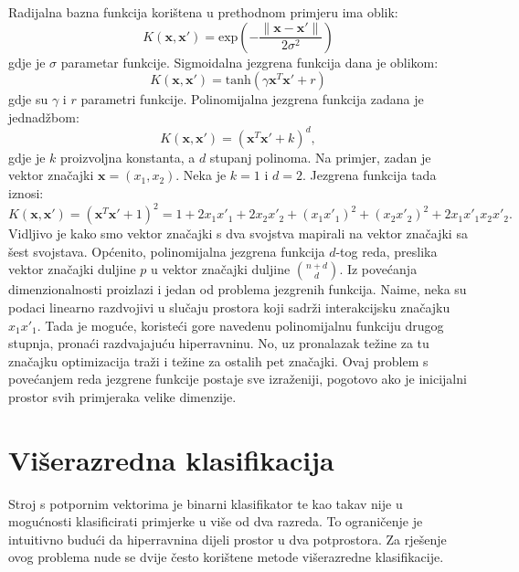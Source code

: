 \documentclass[times, utf8, zavrsni, numeric]{fer}
\begin{document}
Radijalna bazna funkcija korištena u prethodnom primjeru ima oblik:
\begin{equation*}
  K(\mathbf{x}, \mathbf{x}') = \text{exp}(- \frac{\|\mathbf{x} - \mathbf{x}'\|}{2\sigma^2})
\end{equation*}
gdje je $\sigma$ parametar funkcije. Sigmoidalna jezgrena funkcija dana je oblikom:
\begin{equation*}
  K(\mathbf{x}, \mathbf{x}') = \text{tanh}(\gamma\mathbf{x}^T\mathbf{x}' + r)
\end{equation*}
gdje su $\gamma$ i $r$ parametri funkcije.
Polinomijalna jezgrena funkcija zadana je jednadžbom:
\begin{equation*}
  K(\mathbf{x}, \mathbf{x}') = (\mathbf{x}^T\mathbf{x}' + k)^d,
\end{equation*}
gdje je $k$ proizvoljna konstanta, a $d$ stupanj polinoma.
Na primjer, zadan je vektor značajki $\mathbf{x} = (x_1, x_2)$. 
Neka je $k=1$ i $d=2$. Jezgrena funkcija tada iznosi:
\begin{equation*}
  K(\mathbf{x}, \mathbf{x}') = (\mathbf{x}^T\mathbf{x}' + 1)^2 =
  1 + 2x_1x'_1 + 2x_2x'_2 + (x_1x'_1)^2 + (x_2x'_2)^2 + 2x_1x'_1x_2x'_2.
\end{equation*}
Vidljivo je kako smo vektor značajki s dva svojstva mapirali na vektor značajki sa šest svojstava.
Općenito, polinomijalna jezgrena funkcija $d$-tog reda, preslika vektor značajki duljine $p$ u 
vektor značajki duljine $\binom{n + d}{d}$.
Iz povećanja dimenzionalnosti proizlazi i jedan od problema jezgrenih funkcija.
Naime, neka su podaci linearno razdvojivi u slučaju prostora koji sadrži interakcijsku značajku
$x_1x'_1$. Tada je moguće, koristeći gore navedenu polinomijalnu funkciju drugog stupnja, pronaći
razdvajajuću hiperravninu. No, uz pronalazak težine za tu značajku optimizacija traži i težine za ostalih 
pet značajki. Ovaj problem s povećanjem reda jezgrene funkcije postaje sve izraženiji, pogotovo ako je
inicijalni prostor svih primjeraka velike dimenzije.

\section{Višerazredna klasifikacija} \label{sec:multiclass}
Stroj s potpornim vektorima je binarni klasifikator te kao takav nije u mogućnosti klasificirati
primjerke u više od dva razreda.
To ograničenje je intuitivno budući da hiperravnina dijeli prostor u dva potprostora.
Za rješenje ovog problema nude se dvije često korištene metode višerazredne klasifikacije.
\end{document}
